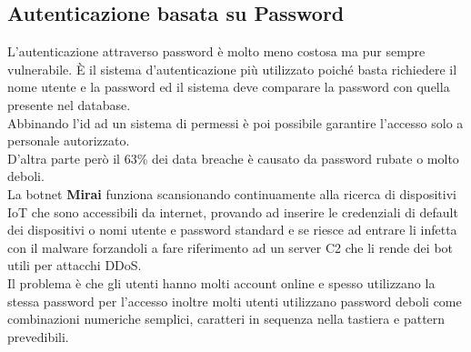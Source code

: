 \subsection{Autenticazione basata su Password}
L'autenticazione attraverso password è molto meno costosa ma pur sempre vulnerabile.
È il sistema d'autenticazione più utilizzato poiché basta richiedere il nome utente e la password ed il sistema deve comparare la password con quella presente nel database.\\
Abbinando l'id ad un sistema di permessi è poi possibile garantire l'accesso solo a personale autorizzato.\\
D'altra parte però il 63\% dei data breache è causato da password rubate o molto deboli.\\
La botnet \textbf{Mirai} funziona scansionando continuamente alla ricerca di dispositivi \acrshort{IoT} che sono accessibili da internet, provando ad inserire le credenziali di default dei dispositivi o nomi utente e password standard e se riesce ad entrare li infetta con il malware forzandoli a fare riferimento ad un server \acrshort{C2} che li rende dei bot utili per attacchi \acrshort{DDoS}.\\
Il problema è che gli utenti hanno molti account online e spesso utilizzano la stessa password per l'accesso inoltre molti utenti utilizzano password deboli come combinazioni numeriche semplici, caratteri in sequenza nella tastiera e pattern prevedibili.


